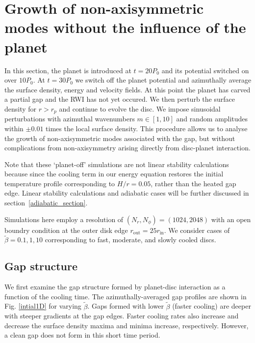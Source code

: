\section{Growth of non-axisymmetric modes without the influence of the
  planet}\label{linear1}
In this section, the planet is introduced at $t=20P_0$ and 
its potential switched on over $10P_0$. At $t=30P_0$ we switch off the
planet potential and azimuthally average the surface density, energy
and velocity fields. At this point the planet has carved a partial
gap and the RWI has not yet occured.
 We then perturb the surface density for $r>r_p$ and continue to 
evolve the disc. We impose  sinusoidal perturbations with 
azimuthal wavenumbers $m\in[1,10]$ and random amplitudes within $\pm 0.01$
 times the local surface density.%
This procedure allows us to analyse the growth of 
non-axisymmetric modes associated with the gap, but without
complications from non-axisymmetry arising directly from disc-planet
interaction.

Note that these `planet-off' simulations are not linear stability
calculations because since the cooling term in our energy equation
restores the initial temperature profile corresponding to $H/r=0.05$,
rather than the heated gap edge. Linear stability calculations and
adiabatic cases will be further discussed in
section~\ref{adiabatic_section}.  


Simulations here employ a resolution of $(N_r,N_{\phi})=(1024,2048)$
with an open boundry condition at the outer disk edge $r_\mathrm{out}=25r_\mathrm{in}$. We consider 
cases of $\tilde{\beta}=0.1,1,10$ corresponding to fast, moderate,
and slowly cooled discs. %

\subsection{Gap structure}
We first examine the gap structure formed by planet-disc
interaction as a function of the cooling time. The azimuthally-averaged 
gap profiles are shown in Fig. \ref{intial1D} for varying
$\tilde\beta$. Gaps formed with lower $\tilde\beta$ (faster cooling)
are deeper with steeper gradients at the gap edges. Faster cooling rates also 
increase and decrease the surface density maxima and 
minima increase, respectively. However, a clean gap does not form
in this short time period. 

